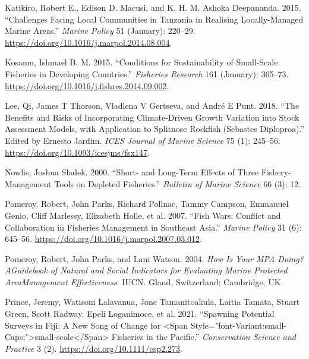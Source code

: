 \documentclass[
]{article}
\newlength{\cslhangindent}
\newlength{\cslentryspacingunit} %
\newenvironment{CSLReferences}[2] %
 {%
  \setlength{\parindent}{0pt}
  \ifodd #1
  \let\oldpar\par
  \def\par{\hangindent=\cslhangindent\oldpar}
  \fi
  \setlength{\parskip}{#2\cslentryspacingunit}
 }%
 {}
\begin{document}
\begin{CSLReferences}{1}{0}
\leavevmode{}%
Katikiro, Robert E., Edison D. Macusi, and K. H. M. Ashoka Deepananda. 2015. {``Challenges Facing Local Communities in {Tanzania} in Realising Locally-Managed Marine Areas.''} \emph{Marine Policy} 51 (January): 220--29. \url{https://doi.org/10.1016/j.marpol.2014.08.004}.

\leavevmode{}%
Kosamu, Ishmael B. M. 2015. {``Conditions for Sustainability of Small-Scale Fisheries in Developing Countries.''} \emph{Fisheries Research} 161 (January): 365--73. \url{https://doi.org/10.1016/j.fishres.2014.09.002}.

\leavevmode{}%
Lee, Qi, James T Thorson, Vladlena V Gertseva, and André E Punt. 2018. {``The Benefits and Risks of Incorporating Climate-Driven Growth Variation into Stock Assessment Models, with Application to {Splitnose} {Rockfish} ({Sebastes} Diploproa).''} Edited by Ernesto Jardim. \emph{ICES Journal of Marine Science} 75 (1): 245--56. \url{https://doi.org/10.1093/icesjms/fsx147}.

\leavevmode{}%
Nowlis, Joshua Sladek. 2000. {``Short- and Long-Term Effects of Three Fishery-Management Tools on Depleted Fisheries.''} \emph{Bulletin of Marine Science} 66 (3): 12.

\leavevmode{}%
Pomeroy, Robert, John Parks, Richard Pollnac, Tammy Campson, Emmanuel Genio, Cliff Marlessy, Elizabeth Holle, et al. 2007. {``Fish Wars: {Conflict} and Collaboration in Fisheries Management in {Southeast} {Asia}.''} \emph{Marine Policy} 31 (6): 645--56. \url{https://doi.org/10.1016/j.marpol.2007.03.012}.

\leavevmode{}%
Pomeroy, Robert, John Parks, and Lani Watson. 2004. \emph{How Is Your {MPA} Doing? {AGuidebook} of {Natural} and {Social} {Indicators} for {Evaluating} {Marine} {Protected} {AreaManagement} {Effectiveness}}. {IUCN}. Gland, Switzerland; Cambridge, UK.

\leavevmode{}%
Prince, Jeremy, Watisoni Lalavanua, Jone Tamanitoakula, Laitia Tamata, Stuart Green, Scott Radway, Epeli Loganimoce, et al. 2021. {``Spawning Potential Surveys in {Fiji}: {A} New Song of Change for {\textless{}}Span Style="font-Variant:small-Caps;"{\textgreater{}}small‐scale{\textless{}}/Span{\textgreater{}} Fisheries in the {Pacific}.''} \emph{Conservation Science and Practice} 3 (2). \url{https://doi.org/10.1111/csp2.273}.


\end{CSLReferences}
\end{document}
